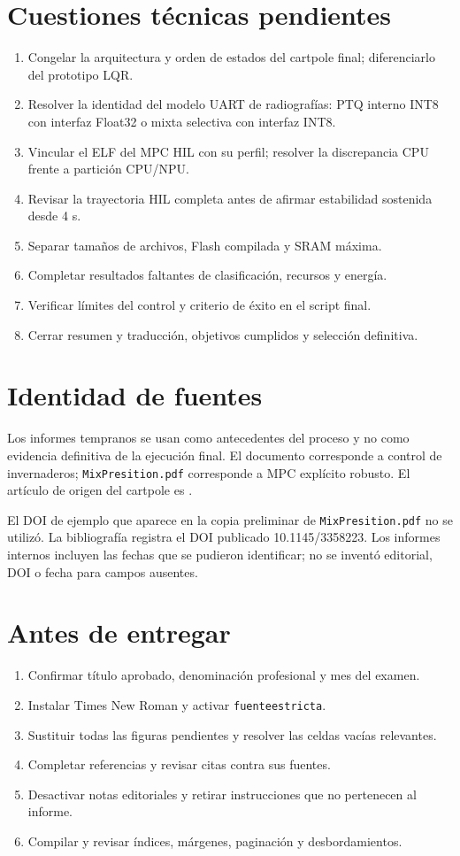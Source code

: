 \section{Cuestiones técnicas pendientes}
\begin{enumerate}
\item Congelar la arquitectura y orden de estados del cartpole final; diferenciarlo del prototipo LQR.
\item Resolver la identidad del modelo UART de radiografías: PTQ interno INT8 con interfaz Float32 o mixta selectiva con interfaz INT8.
\item Vincular el ELF del MPC HIL con su perfil; resolver la discrepancia CPU frente a partición CPU/NPU.
\item Revisar la trayectoria HIL completa antes de afirmar estabilidad sostenida desde 4 s.
\item Separar tamaños de archivos, Flash compilada y SRAM máxima.
\item Completar resultados faltantes de clasificación, recursos y energía.
\item Verificar límites del control y criterio de éxito en el script final.
\item Cerrar resumen y traducción, objetivos cumplidos y selección definitiva.
\end{enumerate}

\section{Identidad de fuentes}
Los informes tempranos se usan como antecedentes del proceso y no como evidencia definitiva de la ejecución final. El documento  corresponde a control de invernaderos; \texttt{MixPresition.pdf} corresponde a MPC explícito robusto. El artículo de origen del cartpole es .

El DOI de ejemplo que aparece en la copia preliminar de \texttt{MixPresition.pdf} no se utilizó. La bibliografía registra el DOI publicado 10.1145/3358223. Los informes internos incluyen las fechas que se pudieron identificar; no se inventó editorial, DOI o fecha para campos ausentes.

\section{Antes de entregar}
\begin{enumerate}
\item Confirmar título aprobado, denominación profesional y mes del examen.
\item Instalar Times New Roman y activar \texttt{fuenteestricta}.
\item Sustituir todas las figuras pendientes y resolver las celdas vacías relevantes.
\item Completar referencias y revisar citas contra sus fuentes.
\item Desactivar notas editoriales y retirar instrucciones que no pertenecen al informe.
\item Compilar y revisar índices, márgenes, paginación y desbordamientos.
\end{enumerate}
